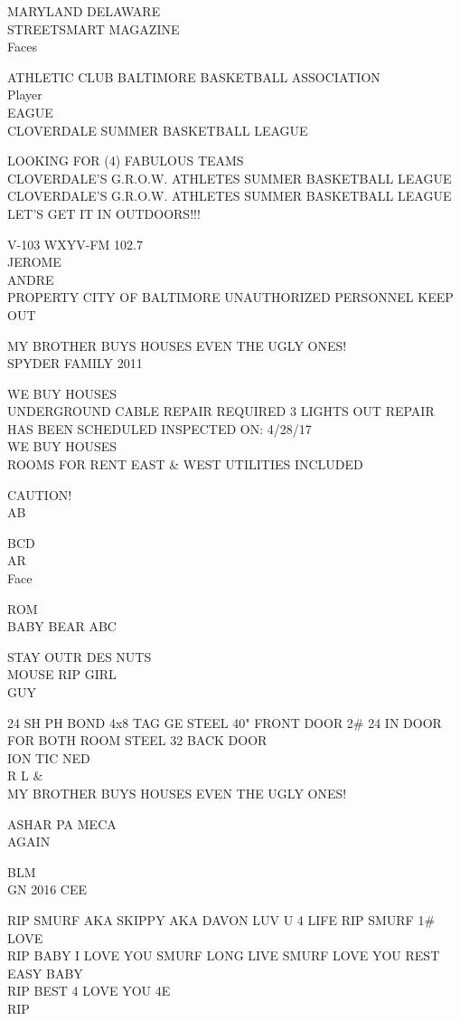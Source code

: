 \documentclass[10pt,letterpaper]{article}
\begin{document}
MARYLAND DELAWARE\\
STREETSMART MAGAZINE\\
Faces

ATHLETIC CLUB BALTIMORE BASKETBALL ASSOCIATION\\
Player\\
EAGUE\\
CLOVERDALE SUMMER BASKETBALL LEAGUE

LOOKING FOR (4) FABULOUS TEAMS\\
CLOVERDALE'S G.R.O.W. ATHLETES SUMMER BASKETBALL LEAGUE\\
CLOVERDALE'S G.R.O.W. ATHLETES SUMMER BASKETBALL LEAGUE LET'S GET IT IN OUTDOORS!!!

V{-}103 WXYV{-}FM 102.7\\
JEROME\\
ANDRE\\
PROPERTY CITY OF BALTIMORE UNAUTHORIZED PERSONNEL KEEP OUT

MY BROTHER BUYS HOUSES EVEN THE UGLY ONES!\\
SPYDER FAMILY 2011

WE BUY HOUSES\\
UNDERGROUND CABLE REPAIR REQUIRED 3 LIGHTS OUT REPAIR HAS BEEN SCHEDULED INSPECTED ON: 4/28/17\\
WE BUY HOUSES\\
ROOMS FOR RENT EAST \& WEST UTILITIES INCLUDED

CAUTION!\\
AB

BCD\\
AR\\
Face

ROM\\
BABY BEAR ABC

STAY OUTR DES NUTS\\
MOUSE RIP GIRL\\
GUY

24 SH PH BOND 4x8 TAG GE STEEL 40" FRONT DOOR 2\# 24 IN DOOR FOR BOTH ROOM STEEL 32 BACK DOOR\\
ION TIC NED\\
R L \&\\
MY BROTHER BUYS HOUSES EVEN THE UGLY ONES!

ASHAR PA MECA\\
AGAIN

BLM\\
GN 2016 CEE

RIP SMURF AKA SKIPPY AKA DAVON LUV U 4 LIFE RIP SMURF 1\# LOVE\\
RIP BABY I LOVE YOU SMURF LONG LIVE SMURF LOVE YOU REST EASY BABY\\
RIP BEST 4 LOVE YOU 4E\\
RIP
\end{document}
